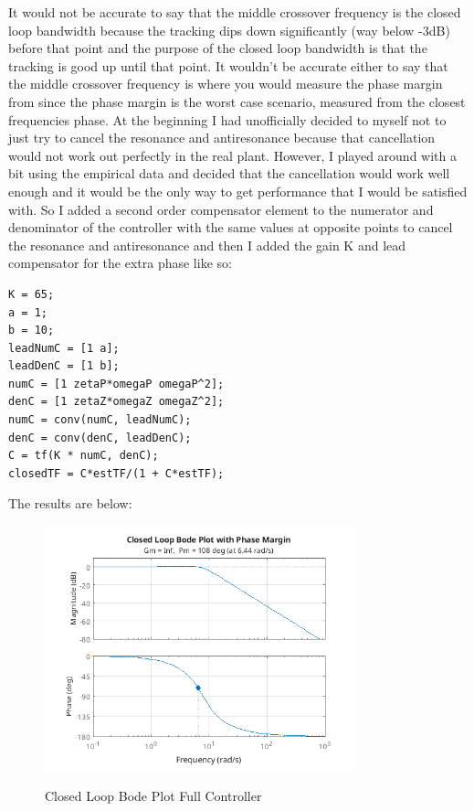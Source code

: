 \documentclass{article}
\begin{document}
It would not be accurate to say that the middle crossover frequency is the closed loop bandwidth because the tracking dips down significantly (way below -3dB) before that point and the purpose of the closed loop bandwidth is that the tracking is good up until that point.
It wouldn't be accurate either to say that the middle crossover frequency is where you would measure the phase margin from since the phase margin is the worst case scenario, measured from the closest frequencies phase.
At the beginning I had unofficially decided to myself not to just try to cancel the resonance and antiresonance because that cancellation would not work out perfectly in the real plant.
However, I played around with a bit using the empirical data and decided that the cancellation would work well enough and it would be the only way to get performance that I would be satisfied with.
So I added a second order compensator element to the numerator and denominator of the controller with the same values at opposite points to cancel the resonance and antiresonance and then I added the gain K and lead compensator for the extra phase like so:

\begin{lstlisting}[style=matlabstyle]
K = 65;
a = 1;
b = 10;
leadNumC = [1 a];
leadDenC = [1 b];
numC = [1 zetaP*omegaP omegaP^2];
denC = [1 zetaZ*omegaZ omegaZ^2];
numC = conv(numC, leadNumC);
denC = conv(denC, leadDenC);
C = tf(K * numC, denC);
closedTF = C*estTF/(1 + C*estTF);    
\end{lstlisting}

The results are below:

\begin{figure}[H]
    \centering
    \includegraphics[width=0.8\textwidth]{feedback.png}
    \label{fig:feedback}
    \caption{Closed Loop Bode Plot Full Controller}
\end{figure}
\end{document}
